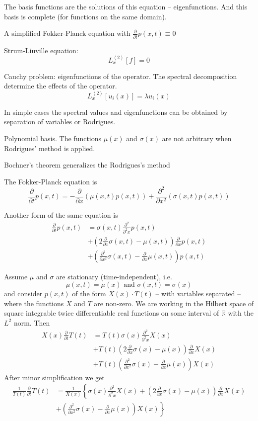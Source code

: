 \documentclass[a4paper]{article}
\newcommand{\clo}[1]{{\left [ #1 \right ]}}
\newcommand{\brac}[1]{{\left ( #1 \right )}}
\newcommand{\brkt}[1]{{\left\langle #1 \right\rangle}}
\newcommand{\Real}{\mathbb{R}}
\begin{document}
The basis functions are the solutions of this equation -- eigenfunctions.
And this basis is complete (for functions on the same domain).

A simplified Fokker-Planck equation with $ \frac{\partial}{\partial t} p(x,t) \equiv 0$


Strum-Liuville equation:
\[L_x^\brkt{2}\clo{f} = 0\]

Cauchy problem: eigenfunctions of the operator. The spectral decomposition determine the effects of the operator.
\[L_x^\brkt{2}\clo{u_i(x)} = \lambda u_i(x)\]

In simple cases the spectral values and eigenfunctions can be obtained by separation of variables or Rodrigues.

Polynomial basis.
The functions $\mu(x)$ and $\sigma(x)$ are not arbitrary when Rodrigues' method is applied.

Bochner's theorem generalizes the Rodrigues's method


The Fokker-Planck equation is
\[\frac{\partial}{\partial t} p(x,t) = - \frac{\partial}{\partial x} \brac{ \mu(x,t) p(x,t) } + \frac{\partial^2}{\partial x^2} \brac{ \sigma(x,t) p(x,t) }\]

Another form of the same equation is
\begin{align*}
	\frac{\partial}{\partial t} p(x,t) &= \sigma(x,t) \frac{\partial^2}{\partial^2 x} p(x,t) \\
	&+ \brac{ 2 \frac{\partial}{\partial x} \sigma(x,t) - \mu(x,t) } \frac{\partial}{\partial x} p(x,t) \\
	&+ \brac{ \frac{\partial^2}{\partial x^2} \sigma(x,t) - \frac{\partial}{\partial x} \mu(x,t) } p(x,t) 
\end{align*}

Assume $\mu$ and $\sigma$ are stationary (time-independent), i.e. \[\mu(x,t) = \mu(x) \text{ and }\sigma(x,t) = \sigma(x)\]
and consider $p(x,t)$ of the form $X(x) \cdot T(t)$ -- with variables separated -- where the functions $X$ and $T$ are non-zero.
We are working in the Hilbert space of square integrable twice differentiable real functions on some interval of $\Real$ with the $L^2$ norm.
Then \begin{align*}
	X(x) \frac{\partial}{\partial t} T(t) &= T(t) \sigma(x) \frac{\partial^2}{\partial^2 x} X(x)\\
	&+ T(t) \brac{ 2 \frac{\partial}{\partial x} \sigma(x) - \mu(x) } \frac{\partial}{\partial x} X(x)\\
	&+ T(t) \brac{ \frac{\partial^2}{\partial x^2} \sigma(x) - \frac{\partial}{\partial x} \mu(x) } X(x)
\end{align*}
After minor simplification we get \begin{align*}
	\frac{1}{T(t)} \frac{\partial}{\partial t} T(t) &= \frac{1}{X(x)}\left \{ \sigma(x) \frac{\partial^2}{\partial^2 x} X(x) + \brac{ 2 \frac{\partial}{\partial x} \sigma(x) - \mu(x) } \frac{\partial}{\partial x} X(x) \right.\\
	&\left . + \brac{ \frac{\partial^2}{\partial x^2} \sigma(x) - \frac{\partial}{\partial x} \mu(x) } X(x) \right \}
\end{align*}
\end{document}
